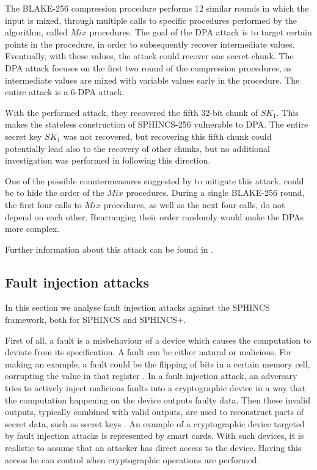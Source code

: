 \documentclass[a4paper,12pt]{article}
\begin{document}
The BLAKE-256 compression procedure performs 12 similar rounds in which the input is mixed, through multiple calls to specific procedures performed by the algorithm, called $Mix$ procedures.
The goal of the DPA attack is to target certain points in the procedure, in order to subsequently recover intermediate values. Eventually, with these values, the attack could recover one secret chunk. The DPA attack focuses on the first two round of the compression procedures, as intermediate values are mixed with variable values early in the procedure.
The entire attack is a 6-DPA attack.


With the performed attack, they recovered the fifth 32-bit chunk of $SK_{1}$. This makes the stateless construction of SPHINCS-256 vulnerable to DPA. The entire secret key $SK_{1}$ was not recovered, but recovering this fifth chunk could potentially lead also to the recovery of other chunks, but no additional investigation was performed in \cite{11_poweranalysis} following this direction.


One of the possible countermeasures suggested by \cite{11_poweranalysis} to mitigate this attack, could be to hide the order of the $Mix$ procedures. During a single BLAKE-256 round, the first four calls to $Mix$ procedures, as well as the next four calls, do not depend on each other. Rearranging their order randomly would make the DPAs more complex.

Further information about this attack can be found in \cite{11_poweranalysis}.

\subsection{Fault injection attacks}


In this section we analyse fault injection attacks against the SPHINCS framework, both for SPHINCS and SPHINCS+.

First of all, a fault is a misbehaviour of a device which causes the computation to deviate from its specification. A fault can be either natural or malicious. For making an example, a fault could be the flipping of bits in a certain memory cell, corrupting the value in that register \cite{12_faultinjection}.
In a fault injection attack, an adversary tries to actively inject malicious faults into a cryptographic device in a way that the computation happening on the device outputs faulty data.
Then these invalid outputs, typically combined with valid outputs, are used to reconstruct parts of secret data, such as secret keys \cite{12_faultinjection}.
An example of a cryptographic device targeted by fault injection attacks is represented by smart cards.
With such devices, it is realistic to assume that an attacker has direct access to the device. Having this access he can control when cryptographic operations are performed.
\end{document}
